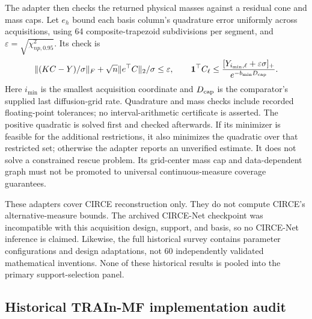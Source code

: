 The adapter then checks the returned physical masses against a residual cone and mass caps. Let $e_h$ bound each basis column's quadrature error uniformly across acquisitions, using 64 composite-trapezoid subdivisions per segment, and $\varepsilon=\sqrt{\chi^2_{np,0.95}}$. Its check is
\begin{equation}\label{eq:circecheck}
 \|(KC-Y)/\sigma\|_F+\sqrt n\|e^\top C\|_2/\sigma\leq\varepsilon,
 \qquad \mathbf{1}^\top C_\ell\leq
 \frac{[Y_{i_{\min},\ell}+\varepsilon\sigma]_+}{e^{-b_{\min}D_{\rm cap}}}.
\end{equation}
Here $i_{\min}$ is the smallest acquisition coordinate and $D_{\rm cap}$ is the comparator's supplied last diffusion-grid rate. Quadrature and mass checks include recorded floating-point tolerances; no interval-arithmetic certificate is asserted. The positive quadratic is solved first and checked afterwards. If its minimizer is feasible for the additional restrictions, it also minimizes the quadratic over that restricted set; otherwise the adapter reports an unverified estimate. It does not solve a constrained rescue problem. Its grid-center mass cap and data-dependent graph must not be promoted to universal continuous-measure coverage guarantees.

These adapters cover CIRCE reconstruction only. They do not compute CIRCE's alternative-measure bounds. The archived CIRCE-Net checkpoint was incompatible with this acquisition design, support, and basis, so no CIRCE-Net inference is claimed. Likewise, the full historical survey contains parameter configurations and design adaptations, not 60 independently validated mathematical inventions. None of these historical results is pooled into the primary support-selection panel.

\subsection{Historical TRAIn-MF implementation audit}\label{app:lineage}

